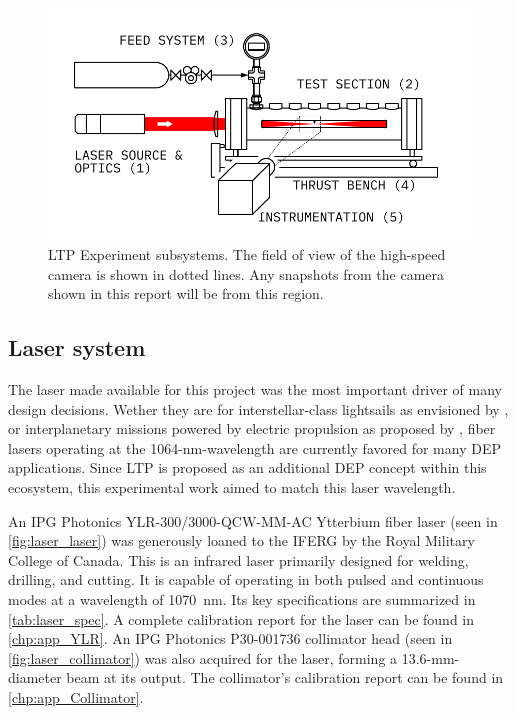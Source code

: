         \begin{figure}[h]
            \centering
            \includegraphics[]{assets/3 design/experiment_diagram}
            \caption[LTP Experiment subsystems]{LTP Experiment subsystems. The field of view of the high-speed camera is shown in dotted lines. Any snapshots from the camera shown in this report will be from this region.}
            \label{fig:exp_subsys}
        \end{figure}

        \subsection{Laser system}
            The laser made available for this project was the most important driver of many design decisions. Wether they are for interstellar-class lightsails as envisioned by \textcite{lubinRoadmapInterstellarFlight2022}, or interplanetary missions powered by electric propulsion as proposed by \textcite{sheerinFastSolarSystem2021}, fiber lasers operating at the 1064-nm-wavelength are currently favored for many DEP applications. Since LTP is proposed as an additional DEP concept within this ecosystem, this experimental work aimed to match this laser wavelength.

            An IPG Photonics YLR-300/3000-QCW-MM-AC Ytterbium fiber laser (seen in \autoref{fig:laser_laser}) was generously loaned to the IFERG by the Royal Military College of Canada. This is an infrared laser primarily designed for welding, drilling, and cutting. It is capable of operating in both pulsed and continuous modes at a wavelength of \qty{1070}{nm}. Its key specifications are summarized in \autoref{tab:laser_spec}. A complete calibration report for the laser can be found in \autoref{chp:app_YLR}. An IPG Photonics P30-001736 collimator head (seen in \autoref{fig:laser_collimator}) was also acquired for the laser, forming a 13.6-mm-diameter beam at its output. The collimator's calibration report can be found in \autoref{chp:app_Collimator}.

